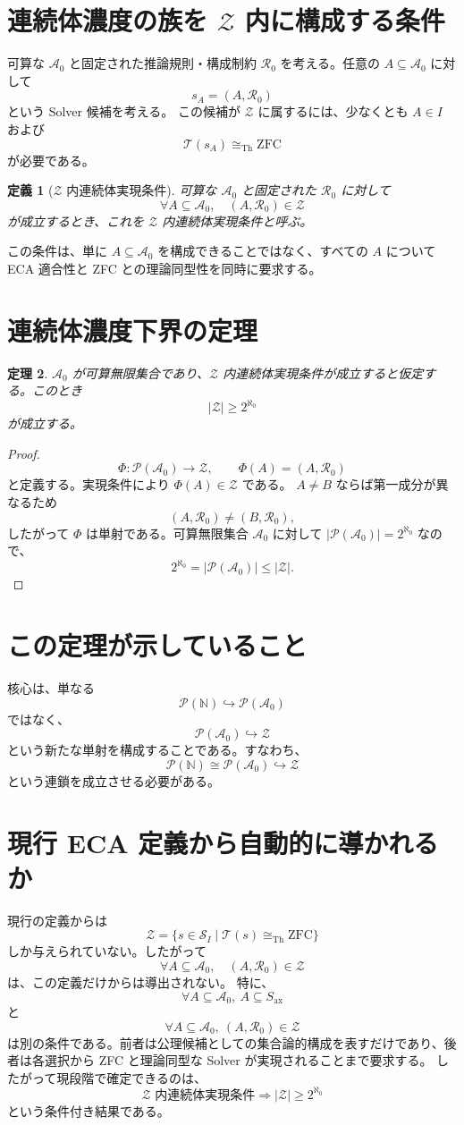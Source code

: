 \documentclass[a4paper,11pt]{jsarticle}
\newtheorem{definition}{定義}[section]
\newtheorem{theorem}[definition]{定理}
\newcommand{\Solver}{\mathcal{S}}
\newcommand{\Ax}{S_{\mathrm{ax}}}
\newcommand{\Pow}{\mathcal{P}}
\begin{document}
\section{連続体濃度の族を $\mathcal{Z}$ 内に構成する条件}
可算な $\mathcal{A}_0$ と固定された推論規則・構成制約 $\mathcal{R}_0$ を考える。任意の $A\subseteq\mathcal{A}_0$ に対して
\[
s_A=(A,\mathcal{R}_0)
\]
という Solver 候補を考える。
この候補が $\mathcal{Z}$ に属するには、少なくとも $A\in I$ および
\[
\mathcal{T}(s_A)\cong_{\mathrm{Th}}\mathrm{ZFC}
\]
が必要である。
\begin{definition}[$\mathcal{Z}$ 内連続体実現条件]
可算な $\mathcal{A}_0$ と固定された $\mathcal{R}_0$ に対して
\[
\boxed{\forall A\subseteq\mathcal{A}_0,\quad (A,\mathcal{R}_0)\in\mathcal{Z}}
\]
が成立するとき、これを $\mathcal{Z}$ 内連続体実現条件と呼ぶ。
\end{definition}
この条件は、単に $A\subseteq\mathcal{A}_0$ を構成できることではなく、すべての $A$ について ECA 適合性と ZFC との理論同型性を同時に要求する。
\section{連続体濃度下界の定理}
\begin{theorem}
$\mathcal{A}_0$ が可算無限集合であり、$\mathcal{Z}$ 内連続体実現条件が成立すると仮定する。このとき
\[
\boxed{|\mathcal{Z}|\geq2^{\aleph_0}}
\]
が成立する。
\end{theorem}
\begin{proof}
\[
\Phi:\Pow(\mathcal{A}_0)\to\mathcal{Z},\qquad \Phi(A)=(A,\mathcal{R}_0)
\]
と定義する。実現条件により $\Phi(A)\in\mathcal{Z}$ である。
$A\neq B$ ならば第一成分が異なるため
\[
(A,\mathcal{R}_0)\neq(B,\mathcal{R}_0),
\]
したがって $\Phi$ は単射である。可算無限集合 $\mathcal{A}_0$ に対して $|\Pow(\mathcal{A}_0)|=2^{\aleph_0}$ なので、
\[
2^{\aleph_0}=|\Pow(\mathcal{A}_0)|\leq|\mathcal{Z}|.
\]
\end{proof}
\section{この定理が示していること}
核心は、単なる
\[
\Pow(\mathbb{N})\hookrightarrow\Pow(\mathcal{A}_0)
\]
ではなく、
\[
\Pow(\mathcal{A}_0)\hookrightarrow\mathcal{Z}
\]
という新たな単射を構成することである。すなわち、
\[
\Pow(\mathbb{N})\cong\Pow(\mathcal{A}_0)\hookrightarrow\mathcal{Z}
\]
という連鎖を成立させる必要がある。
\section{現行 ECA 定義から自動的に導かれるか}
現行の定義からは
\[
\mathcal{Z}=\{s\in\Solver_I\mid\mathcal{T}(s)\cong_{\mathrm{Th}}\mathrm{ZFC}\}
\]
しか与えられていない。したがって
\[
\forall A\subseteq\mathcal{A}_0,\quad(A,\mathcal{R}_0)\in\mathcal{Z}
\]
は、この定義だけからは導出されない。
特に、
\[
\forall A\subseteq\mathcal{A}_0,\ A\subseteq\Ax
\]
と
\[
\forall A\subseteq\mathcal{A}_0,\ (A,\mathcal{R}_0)\in\mathcal{Z}
\]
は別の条件である。前者は公理候補としての集合論的構成を表すだけであり、後者は各選択から ZFC と理論同型な Solver が実現されることまで要求する。
したがって現段階で確定できるのは、
\[
\boxed{\text{$\mathcal{Z}$ 内連続体実現条件}\Longrightarrow |\mathcal{Z}|\geq2^{\aleph_0}}
\]
という条件付き結果である。
\end{document}
